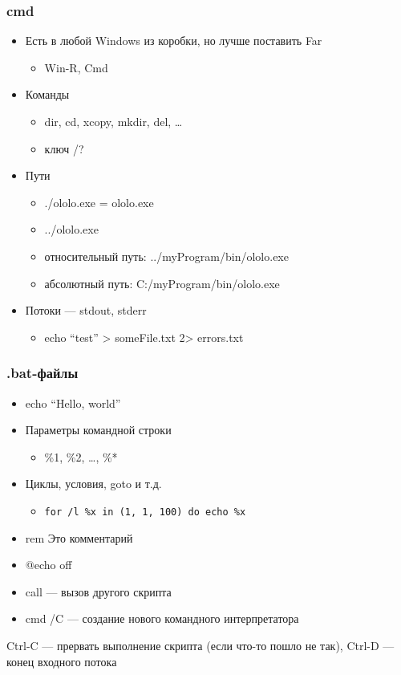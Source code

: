 \documentclass[xetex,mathserif,serif]{beamer}
\begin{document}
	\begin{frame}
		\frametitle{cmd}
		\begin{itemize}
			\item Есть в любой Windows из коробки, но лучше поставить Far
			\begin{itemize}
				\item Win-R, Cmd
			\end{itemize}
			\item Команды
			\begin{itemize}
				\item dir, cd, xcopy, mkdir, del, …
				\item ключ /?
			\end{itemize}
			\item Пути
			\begin{itemize}
				\item ./ololo.exe = ololo.exe
				\item ../ololo.exe
				\item относительный путь: ../myProgram/bin/ololo.exe
				\item абсолютный путь: C:/myProgram/bin/ololo.exe
			\end{itemize}
			\item Потоки --- stdout, stderr
			\begin{itemize}
				\item echo ``test'' > someFile.txt 2> errors.txt
			\end{itemize}
		\end{itemize}
	\end{frame}

	\begin{frame}[fragile]
		\frametitle{.bat-файлы}
		\begin{itemize}
			\item echo ``Hello, world''
			\item Параметры командной строки
			\begin{itemize}
				\item  \%1, \%2, …, \%*
			\end{itemize}
			\item Циклы, условия, goto и т.д.
			\begin{itemize}
				\item 
					\begin{footnotesize}
						\begin{verbatim}
for /l %x in (1, 1, 100) do echo %x
						\end{verbatim}
					\end{footnotesize}
			\end{itemize}
			\item rem Это комментарий
			\item @echo off
			\item call --- вызов другого скрипта
			\item cmd /C --- создание нового командного интерпретатора
		\end{itemize}
		Ctrl-C --- прервать выполнение скрипта (если что-то пошло не так), Ctrl-D --- конец входного потока
	\end{frame}
\end{document}
